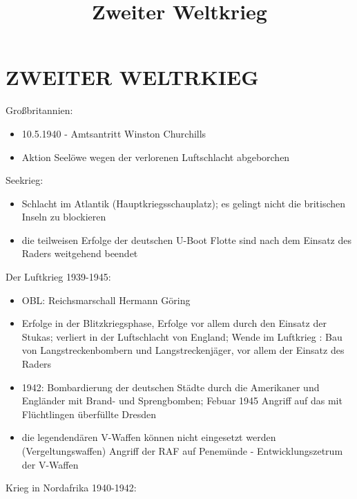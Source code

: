 \documentclass[a4paper,final]{book}
\title{Zweiter Weltkrieg}
\begin{document}
\chapter{ZWEITER WELTRKIEG}

Großbritannien:

	\begin{itemize}
	\item 10.5.1940 - Amtsantritt Winston Churchills
	\item Aktion Seelöwe wegen der verlorenen Luftschlacht abgeborchen
	\end{itemize}

Seekrieg:

	\begin{itemize}
	\item Schlacht im Atlantik (Hauptkriegsschauplatz); es gelingt nicht die britischen Inseln zu blockieren
	\item die teilweisen Erfolge der deutschen U-Boot Flotte sind nach dem Einsatz des Raders weitgehend beendet
	\end{itemize}
	
Der Luftkrieg 1939-1945:

	\begin{itemize}
	\item OBL: Reichsmarschall Hermann Göring
	\item Erfolge in der Blitzkriegsphase, Erfolge vor allem durch den Einsatz der Stukas; verliert in der Luftschlacht von England; Wende im Luftkrieg
	: Bau von Langstreckenbombern und Langstreckenjäger, vor allem der Einsatz des Raders
	\item 1942: Bombardierung der deutschen Städte durch die Amerikaner und Engländer mit Brand- und Sprengbomben; Febuar 1945 Angriff auf das mit
	Flüchtlingen überfüllte Dresden
	\item die legendendären V-Waffen können nicht eingesetzt werden (Vergeltungswaffen) Angriff der RAF auf Penemünde - Entwicklungszetrum der V-Waffen
	\end{itemize}

Krieg in Nordafrika 1940-1942:
\end{document}
